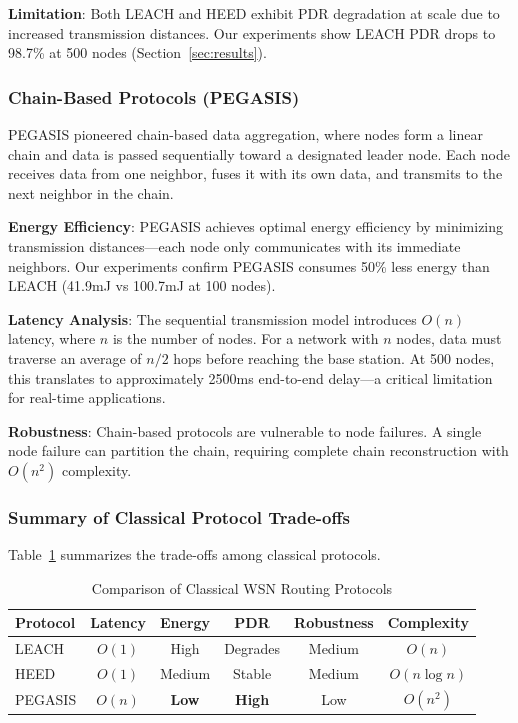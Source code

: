 \textbf{Limitation}: Both LEACH and HEED exhibit PDR degradation at scale
due to increased transmission distances. Our experiments show LEACH PDR
drops to 98.7\% at 500 nodes (Section~\ref{sec:results}).

\subsubsection{Chain-Based Protocols (PEGASIS)}

PEGASIS \cite{lindsey2002pegasis} pioneered chain-based data aggregation,
where nodes form a linear chain and data is passed sequentially toward a
designated leader node. Each node receives data from one neighbor, fuses
it with its own data, and transmits to the next neighbor in the chain.

\textbf{Energy Efficiency}: PEGASIS achieves optimal energy efficiency by
minimizing transmission distances---each node only communicates with its
immediate neighbors. Our experiments confirm PEGASIS consumes 50\% less
energy than LEACH (41.9mJ vs 100.7mJ at 100 nodes).

\textbf{Latency Analysis}: The sequential transmission model introduces
$O(n)$ latency, where $n$ is the number of nodes. For a network with $n$
nodes, data must traverse an average of $n/2$ hops before reaching the
base station. At 500 nodes, this translates to approximately 2500ms
end-to-end delay---a critical limitation for real-time applications.

\textbf{Robustness}: Chain-based protocols are vulnerable to node failures.
A single node failure can partition the chain, requiring complete chain
reconstruction with $O(n^2)$ complexity.

\subsubsection{Summary of Classical Protocol Trade-offs}

Table~\ref{tab:classical_comparison} summarizes the trade-offs among
classical protocols.

\begin{table}[htbp]
\centering
\caption{Comparison of Classical WSN Routing Protocols}
\label{tab:classical_comparison}
\begin{tabular}{@{}lccccc@{}}
\toprule
Protocol & Latency & Energy & PDR & Robustness & Complexity \\
\midrule
LEACH & $O(1)$ & High & Degrades & Medium & $O(n)$ \\
HEED & $O(1)$ & Medium & Stable & Medium & $O(n \log n)$ \\
PEGASIS & $O(n)$ & \textbf{Low} & \textbf{High} & Low & $O(n^2)$ \\
\bottomrule
\end{tabular}
\end{table}

